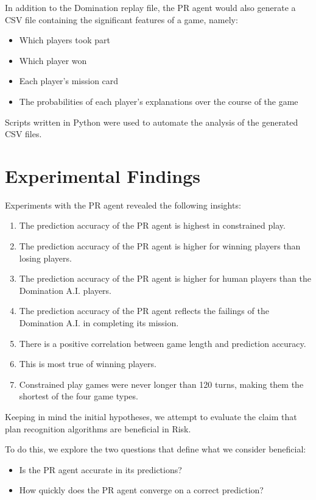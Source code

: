 \documentclass[parskip]{cs4rep}
\begin{document}
In addition to the Domination replay file, the PR agent would also generate a CSV file containing the significant features of a game, namely:

\begin{itemize}
\item
Which players took part
\item
Which player won
\item
Each player's mission card
\item
The probabilities of each player's explanations over the course of the game
\end{itemize}

Scripts written in Python were used to automate the analysis of the generated CSV files.

\newpage

\section{Experimental Findings}

Experiments with the PR agent revealed the following insights:

\begin{enumerate}
\item
The prediction accuracy of the PR agent is highest in constrained play.
\item
The prediction accuracy of the PR agent is higher for winning players than losing players. 
\item
The prediction accuracy of the PR agent is higher for human players than the Domination A.I. players.
\item
The prediction accuracy of the PR agent reflects the failings of the Domination A.I. in completing its mission.
\item
There is a positive correlation between game length and prediction accuracy. 
\item
This is most true of winning players. 
\item
Constrained play games were never longer than 120 turns, making them the shortest of the four game types.
\end{enumerate}

Keeping in mind the initial hypotheses, we attempt to evaluate the claim that plan recognition algorithms are beneficial in Risk.

To do this, we explore the two questions that define what we consider beneficial:
\begin{itemize}
\item
Is the PR agent accurate in its predictions?
\item
How quickly does the PR agent converge on a correct prediction?
\end{itemize}
\end{document}
